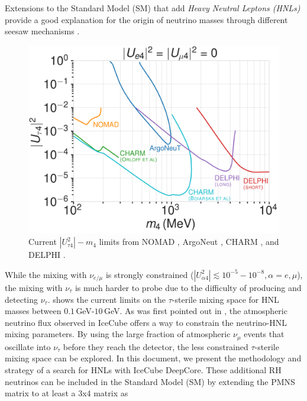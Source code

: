 Extensions to the Standard Model (SM) that add \textit{Heavy Neutral Leptons (HNLs)} provide a good explanation for the origin of neutrino masses through different seesaw mechanisms .
\begin{figure}
  \includegraphics{figures/hnl_simulation/theory/UtauN_custom_plots_LF_grid_white.png}
  \caption[Current $|U_{\tau4}^2|-m_4$ limits]{Current $|U_{\tau4}^2|-m_4$ limits from NOMAD \cite{NOMAD:2001eyx}, ArgoNeut \cite{ArgoNeuT:2021clc}, CHARM \cite{Orloff:2002de, Boiarska:2021yho}, and DELPHI \cite{DELPHI:1996qcc}.}
\end{figure}
While the mixing with $\nu_{e/\mu}$ is strongly constrained ($|U_{\alpha4}^2| \lesssim 10^{-5}-10^{-8}, \alpha=e,\mu$), the mixing with $\nu_{\tau}$ is much harder to probe due to the difficulty of producing and detecting $\nu_\tau$.  shows the current limits on the $\tau$-sterile mixing space for HNL masses between $0.1$\,GeV-$10$\,GeV. As was first pointed out in , the atmospheric neutrino flux observed in IceCube offers a way to constrain the neutrino-HNL mixing parameters. By using the large fraction of atmospheric $\nu_{\mu}$ events that oscillate into $\nu_{\tau}$ before they reach the detector, the less constrained $\tau$-sterile mixing space can be explored. In this document, we present the methodology and strategy of a search for HNLs with IceCube DeepCore. These additional RH neutrinos can be included in the Standard Model (SM) by extending the PMNS matrix to at least a 3x4 matrix as
